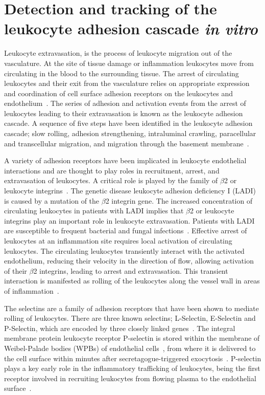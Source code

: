 \chapter{Detection and tracking of the leukocyte adhesion cascade \emph{in vitro}}
\ifpdf
    \graphicspath{{chapter_4/figs/}}
\fi
Leukocyte extravasation, is the process of leukocyte migration out of the vasculature. At the site of tissue damage or inflammation leukocytes move from circulating in the blood to the surrounding tissue. The arrest of circulating leukocytes and their exit from the vasculature relies on appropriate expression and coordination of cell surface adhesion receptors on the leukocytes and endothelium~\cite{Mayadas1993}. The series of adhesion and activation events from the arrest of leukocytes leading to their extravasation is known as the leukocyte adhesion cascade. A sequence of five steps have been identified in the leukocyte adhesion cascade; slow rolling, adhesion strengthening, intraluminal crawling, paracellular and transcellular migration, and migration through the basement membrane~\cite{Ley2007}.

A variety of adhesion receptors have been implicated in leukocyte endothelial interactions and are thought to play roles in recruitment, arrest, and extravasation of leukocytes. A critical role is played by the family of $\beta$2 or leukocyte integrins~\cite{Springer1990, Mayadas1993}. The genetic disease leukocyte adhesion deficiency I (LADI) is caused by a mutation of the $\beta$2 integrin gene. The increased concentration of circulating leukocytes in patients with LADI implies that $\beta$2 or leukocyte integrins play an important role in leukocyte extravasation. Patients with LADI are susceptible to frequent bacterial and fungal infections~\cite{Anderson1987}. Effective arrest of leukocytes at an inflammation site requires local activation of circulating leukocytes. The circulating leukocytes transiently interact with the activated endothelium, reducing their velocity in the direction of flow, allowing activation of their $\beta$2 integrins, leading to arrest and extravasation. This transient interaction is manifested as rolling of the leukocytes along the vessel wall in areas of inflammation~\cite{Mayadas1993, Atherton1972}.

The selectins are a family of adhesion receptors that have been shown to mediate rolling of leukocytes. There are three known selectins; L-Selectin, E-Selectin and P-Selectin, which are encoded by three closely linked genes~\cite{Watson1990}. The integral membrane protein leukocyte receptor P-selectin is stored within the membrane of Weibel-Palade bodies (WPBs) of endothelial cells~\cite{Bonfanti1989, McEver1989}, from where it is delivered to the cell surface within minutes after secretagogue-triggered exocytosis~\cite{McEver2002}. P-selectin plays a key early role in the inflammatory trafficking of leukocytes, being the first receptor involved in recruiting leukocytes from flowing plasma to the endothelial surface~\cite{Larsen1989}.

